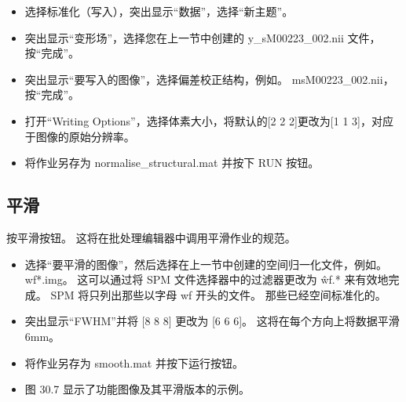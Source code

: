 \begin{itemize}
	\item 选择标准化（写入），突出显示“数据”，选择“新主题”。
	
	\item 突出显示“变形场”，选择您在上一节中创建的 y\_sM00223\_002.nii 文件，按“完成”。
	
	\item 突出显示“要写入的图像”，选择偏差校正结构，例如。 msM00223\_002.nii，按“完成”。
	
	\item 打开“Writing Options”，选择体素大小，将默认的[2 2 2]更改为[1 1 3]，对应于图像的原始分辨率。
	
	\item 将作业另存为 normalise\_structural.mat 并按下 RUN 按钮。
\end{itemize}



\subsection{平滑}
按平滑按钮。 这将在批处理编辑器中调用平滑作业的规范。

\begin{itemize}
	\item 选择“要平滑的图像”，然后选择在上一节中创建的空间归一化文件，例如。 wf*.img。 这可以通过将 SPM 文件选择器中的过滤器更改为 \^wf.* 来有效地完成。 SPM 将只列出那些以字母 wf 开头的文件。 那些已经空间标准化的。
	
	\item 突出显示“FWHM”并将 [8 8 8] 更改为 [6 6 6]。 这将在每个方向上将数据平滑 6mm。
	
	\item 将作业另存为 smooth.mat 并按下运行按钮。
	
	\item 图 30.7 显示了功能图像及其平滑版本的示例。
\end{itemize}


